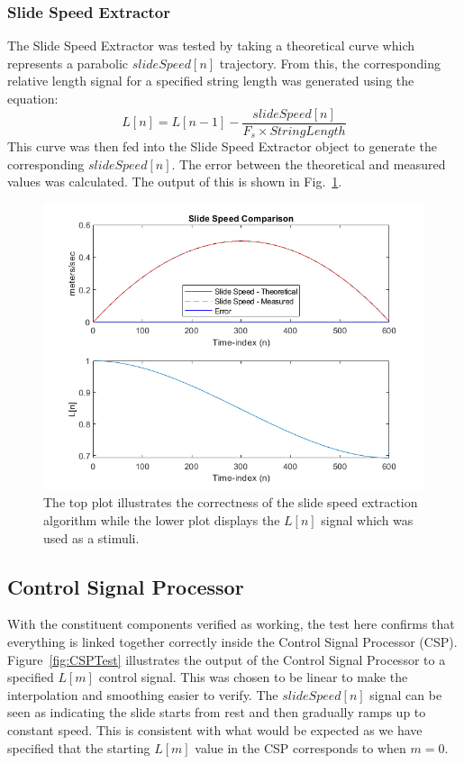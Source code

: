 \documentclass[../main.tex]{subfiles}
\begin{document}
\subsubsection {Slide Speed Extractor}
The Slide Speed Extractor was tested by taking a theoretical curve which represents a parabolic $slideSpeed[n]$ trajectory. From this, the corresponding relative length signal for a specified string length was generated using the equation:
\begin{equation}
    L[n] = L[n-1] - \frac{slideSpeed[n]}{F_s \times StringLength}
\end{equation}
This curve was then fed into the Slide Speed Extractor object to generate the corresponding $slideSpeed[n]$. The error between the theoretical and measured values was calculated. The output of this is shown in Fig.~\ref{fig:SlideSpeedTest}.

\begin{figure}[h]
    \centering
    \includegraphics[scale=.65]{./images/plots/SlideSpeedExtractorTest.png}
    \caption{The top plot illustrates the correctness of the slide speed extraction algorithm while the lower plot displays the $L[n]$ signal which was used as a stimuli.}
    \label{fig:SlideSpeedTest}
\end{figure}

\subsection{Control Signal Processor}
With the constituent components verified as working, the test here confirms that everything is linked together correctly inside the Control Signal Processor (CSP). Figure~\ref{fig:CSPTest} illustrates the output of the Control Signal Processor to a specified $L[m]$ control signal. This was chosen to be linear to make the interpolation and smoothing easier to verify. The $slideSpeed[n]$ signal can be seen as indicating the slide starts from rest and then gradually ramps up to constant speed. This is consistent with what would be expected as we have specified that the starting $L[m]$ value in the CSP corresponds to when $m = 0$.
\end{document}
